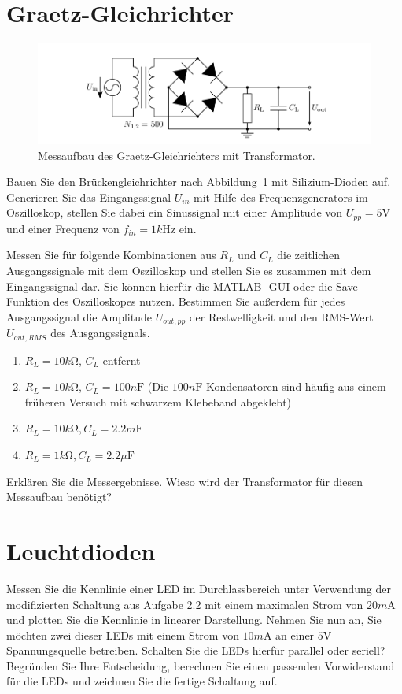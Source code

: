 \documentclass[10pt]{scrreprt}
\begin{document}
    \section{Graetz-Gleichrichter}
    \begin{figure}[H]
        \centering
        \includegraphics[width=\textwidth]{abb15.png}
        \caption{Messaufbau des Graetz-Gleichrichters mit Transformator.}
        \label{fig:abb15}
    \end{figure}
    Bauen Sie den Brückengleichrichter nach Abbildung~\ref{fig:abb15} mit Silizium-Dioden auf.
    Generieren Sie das Eingangssignal $U_{in}$ mit Hilfe des Frequenzgenerators im Oszilloskop, stellen
    Sie dabei ein Sinussignal mit einer Amplitude von $U_{pp} = 5\si{\volt}$ und einer Frequenz von
    $f_{in} = 1\si{k\hertz}$ ein.

    Messen Sie für folgende Kombinationen aus $R_L$ und $C_L$ die zeitlichen Ausgangssignale mit
    dem Oszilloskop und stellen Sie es zusammen mit dem Eingangssignal dar. Sie können
    hierfür die MATLAB -GUI oder die Save-Funktion des Oszilloskopes nutzen. Bestimmen
    Sie außerdem für jedes Ausgangssignal die Amplitude $U_{out,pp}$ der Restwelligkeit und den
    RMS-Wert $U_{out,RMS}$ des Ausgangssignals.

    \begin{enumerate}
        \item $R_L  = 10\si{k \ohm}$, $C_L$ entfernt
        \item $R_L  = 10\si{k \ohm}$, $C_L = 100\si{n\farad}$ (Die $100\si{n\farad}$ Kondensatoren sind
            häufig aus einem früheren Versuch mit schwarzem Klebeband abgeklebt)
        \item $R_L  = 10\si{k \ohm}, C_L = 2.2\si{m\farad}$
        \item $R_L  = 1\si{k \ohm}, C_L = 2.2\si{\mu \farad}$
    \end{enumerate}
    Erklären Sie die Messergebnisse. Wieso wird der Transformator für diesen Messaufbau
    benötigt?

    \section{Leuchtdioden}
    Messen Sie die Kennlinie einer LED im Durchlassbereich unter Verwendung der
    modifizierten Schaltung aus Aufgabe 2.2 mit einem maximalen Strom von $20\si{m\ampere}$ und plotten
    Sie die Kennlinie in linearer Darstellung.
    Nehmen Sie nun an, Sie möchten zwei dieser LEDs mit einem Strom von $10\si{m\ampere}$ an
    einer $5\si{\volt}$ Spannungsquelle betreiben. Schalten Sie die LEDs hierfür parallel oder seriell?
    Begründen Sie Ihre Entscheidung, berechnen Sie einen passenden Vorwiderstand für die
    LEDs und zeichnen Sie die fertige Schaltung auf.
\end{document}
